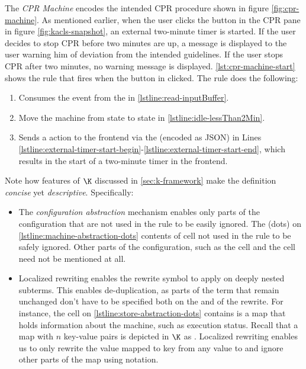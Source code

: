 The \textit{CPR Machine} encodes the intended CPR procedure
shown in figure \ref{fig:cpr-machine}. As mentioned earlier, when the user clicks
the  button in the CPR pane in figure \ref{fig:kacls-snapshot},
an external two-minute timer is started. If the user decides to stop CPR before
two minutes are up, a message is displayed to the user warning him of
deviation from the intended guidelines. If the user stops CPR after
two minutes, no warning message is displayed.
\autoref{lst:cpr-machine-start} shows the rule that
fires when the  button in clicked.
The rule does the following:
\begin{enumerate}[label=(\alph*)]
  \item Consumes the  event from the  in
    \autoref{lstline:read-inputBuffer}.
  \item Move the machine from state  to state 
    in \autoref{lstline:idle-lessThan2Min}.
  \item Sends a  action to the frontend via the
     (encoded as JSON) in
    Lines \ref{lstline:external-timer-start-begin}-\ref{lstline:external-timer-start-end},
    which results in the start of a two-minute timer in the frontend.
\end{enumerate}
Note how features of $\K$ discussed in \autoref{sec:k-framework}
make the definition \emph{concise} yet \emph{descriptive}. Specifically:
\begin{itemize}
  \item The \emph{configuration abstraction} mechanism enables only parts of the
  configuration that are not used in the rule to be easily ignored.
    The  (dots) on
    \autoref{lstline:machine-abstraction-dots} contents of cell
    not used in the rule to be safely ignored. Other parts
    of the configuration, such as the  cell
    and the  cell need not be mentioned at all.
  \item Localized rewriting enables the rewrite symbol \inlinek{=>} to
    apply on deeply nested subterms. This enables de-duplication,
    as parts of the term that remain unchanged don't have to be
    specified both on the \LHS{} and \RHS{} of the rewrite. For instance,
    the  cell on \autoref{lstline:store-abstraction-dots}
    contains is a map that holds information about the machine, such as
    execution status. Recall that a map with $n$ key-value pairs is
    depicted in $\K$ as
    . Localized rewriting enables us to only rewrite the
    value mapped to key  from any value
    to  and ignore other parts of the map using 
    notation.
\end{itemize}
